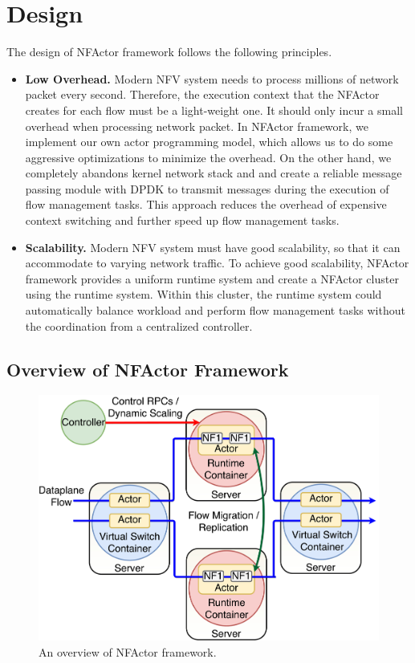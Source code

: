 \section{Design}

The design of NFActor framework follows the following principles.

\begin{itemize}

\item \textbf{Low Overhead.} Modern NFV system needs to process millions of network packet every second. Therefore, the execution context that the NFActor creates for each flow must be a light-weight one. It should only incur a small overhead when processing network packet. In NFActor framework, we implement our own actor programming model, which allows us to do some aggressive optimizations to minimize the overhead. On the other hand, we completely abandons kernel network stack and and create a reliable message passing module with DPDK \cite{dpdk} to transmit messages during the execution of flow management tasks. This approach reduces the overhead of expensive context switching and further speed up flow management tasks.

\item \textbf{Scalability.} Modern NFV system must have good scalability, so that it can accommodate to varying network traffic. To achieve good scalability, NFActor framework provides a uniform runtime system and create a NFActor cluster using the runtime system. Within this cluster, the runtime system could automatically balance workload and perform flow management tasks without the coordination from a centralized controller.

\end{itemize}

\subsection{Overview of NFActor Framework}

\begin{figure}[!t]
  \centering
  \includegraphics[width=\columnwidth]{figure/new-nfactor-cluster.pdf}
  \caption{An overview of NFActor framework.}
  \label{fig:runtime}
\end{figure}

